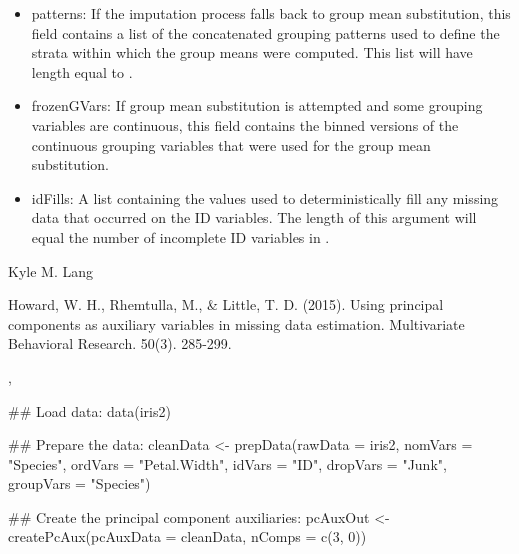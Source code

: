 \documentclass[letterpaper]{book}
\begin{document}
\begin{Value}
\begin{itemize}
\item patterns: 
If the imputation process falls back to group mean substitution,
this field contains a list of the concatenated grouping patterns
used to define the strata within which the group means were
computed. This list will have length equal to
.

\item frozenGVars: 
If group mean substitution is attempted and some grouping
variables are continuous, this field contains the binned versions
of the continuous grouping variables that were used for the group
mean substitution.

\item idFills: 
A list containing the values used to deterministically fill any
missing data that occurred on the ID variables. The length of this
argument will equal the number of incomplete ID variables in
.


\end{itemize}

\end{Value}
%
\begin{Author}\relax
Kyle M. Lang
\end{Author}
%
\begin{References}\relax
Howard, W. H., Rhemtulla, M., \& Little, T. D. (2015). Using principal
components as auxiliary variables in missing data estimation.
Multivariate Behavioral Research. 50(3). 285-299.
\end{References}
%
\begin{SeeAlso}\relax
{}, 
\end{SeeAlso}
%
\begin{Examples}
\begin{ExampleCode}
## Load data:
data(iris2)

## Prepare the data:
cleanData <- prepData(rawData   = iris2,
                      nomVars   = "Species",
                      ordVars   = "Petal.Width",
                      idVars    = "ID",
                      dropVars  = "Junk",
                      groupVars = "Species")

## Create the principal component auxiliaries:
pcAuxOut <- createPcAux(pcAuxData = cleanData, nComps = c(3, 0))
\end{ExampleCode}
\end{Examples}
\end{document}
